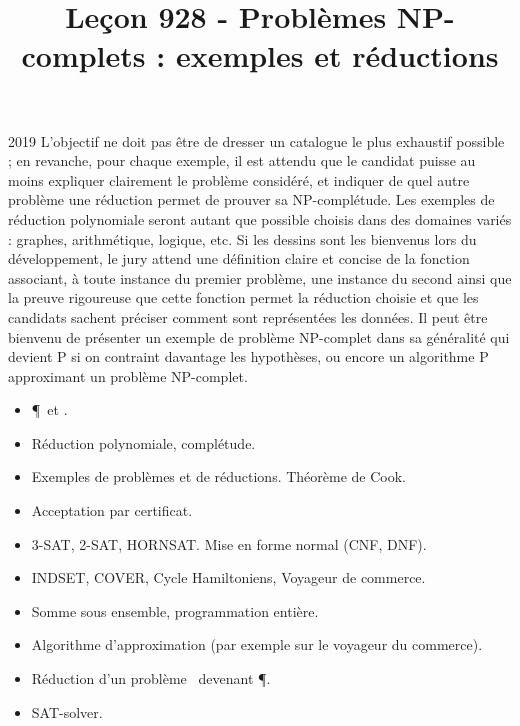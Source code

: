 \documentclass{agregfiche}
\title{Leçon 928 - Problèmes NP-complets : exemples et réductions}
\begin{document}
\maketitle

\secrapports
\begin{rapport}{2019}
    L’objectif ne doit pas être de dresser un catalogue le plus
    exhaustif possible ; en revanche, pour chaque
    exemple, il est attendu que le candidat puisse au moins expliquer
    clairement le problème considéré, et
    indiquer de quel autre problème une réduction permet de prouver
    sa NP-complétude.
    Les exemples de réduction polynomiale seront autant que possible
    choisis dans des domaines variés :
    graphes, arithmétique, logique, etc. Si les dessins sont les
    bienvenus lors du développement, le jury
    attend une définition claire et concise de la fonction associant,
    à toute instance du premier problème,
    une instance du second ainsi que la preuve rigoureuse que cette
    fonction permet la réduction choisie
    et que les candidats sachent préciser comment sont représentées
    les données.
    Il peut être bienvenu de présenter un exemple de problème NP-complet dans sa généralité qui devient
    P si on contraint davantage les
    hypothèses, ou encore un algorithme P
    approximant un problème NP-complet.
\end{rapport}

\secindispensables

\begin{itemize}
	\item \P\ et \NP.
    \item Réduction polynomiale, complétude.
    \item Exemples de problèmes et de réductions. Théorème de Cook.
\end{itemize}

\secasavoir

\begin{itemize}
    \item Acceptation par certificat.
    \item 3-SAT, 2-SAT, HORNSAT. Mise en forme normal (CNF, DNF).
    \item INDSET, COVER, Cycle Hamiltoniens, Voyageur de commerce.
    \item Somme sous ensemble, programmation entière.

\end{itemize}

\secidees

\begin{itemize}
	\item Algorithme d'approximation (par exemple sur le voyageur du
    commerce).
    \item Réduction d'un problème \NP\ devenant \P.
    \item SAT-solver.
\end{itemize}
\end{document}
